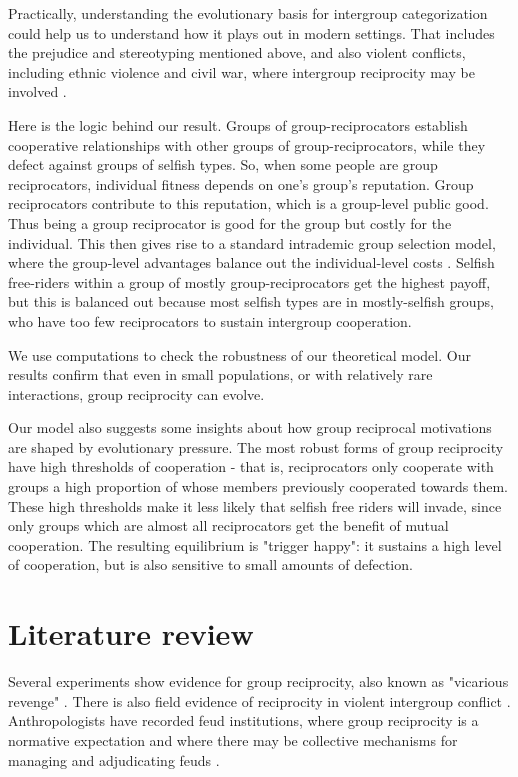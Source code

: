 \documentclass[12pt,a4paper]{article}
\begin{document}
Practically, understanding the evolutionary basis
for intergroup categorization could help us to understand how it plays out 
in modern settings. That includes the prejudice and stereotyping mentioned above,
and also violent conflicts, including ethnic violence and civil war, where
intergroup reciprocity may be involved 
\parencite{horowitz1985ethnicgroups,horowitz2001thedeadly,haushofer_both_2010}. 

Here is the logic behind our result. Groups of group-reciprocators
establish cooperative relationships with other groups of group-reciprocators,
while they defect against groups of selfish types. So, when some people are 
group reciprocators, individual fitness depends on one's group's reputation. Group 
reciprocators contribute to this reputation, which is a group-level public good. 
Thus being a group reciprocator is good for the group but costly for the individual. 
This then gives rise to a standard intrademic group selection model, where the group-level advantages balance out the individual-level costs \parencite{wilson1983group,wade1978critical}. Selfish free-riders within a group of mostly group-reciprocators get the highest payoff, but this is balanced
out because most selfish types are in mostly-selfish groups, who have too
few reciprocators to sustain intergroup cooperation.

We use computations to check the robustness of our theoretical model. Our
results confirm that even in small populations, or with relatively rare interactions,
group reciprocity can evolve.

Our model also suggests some insights
about how group reciprocal motivations are shaped by evolutionary pressure. The 
most robust forms of group reciprocity have high thresholds of cooperation - that is, reciprocators only cooperate with groups a high proportion of whose members previously
cooperated towards them. These high thresholds make it less likely that selfish
free riders will invade, since only groups which are almost all reciprocators
get the benefit of mutual cooperation. The resulting equilibrium is 
"trigger happy": it sustains a high level of cooperation, but is also sensitive 
to small amounts of defection.

\section{Literature review}

Several experiments show evidence for group reciprocity, also known as "vicarious
revenge" \parencite{lickel_vicarious_2006,gaertner2008whenrejection,stenstrom_roles_2008,hugh2017intergroup,hugh2019humans,romano2022direct}. There is also field 
evidence of reciprocity in violent intergroup conflict \parencite{haushofer_both_2010}.
Anthropologists have recorded feud institutions, where group reciprocity is a
normative expectation and where there may be collective mechanisms for managing 
and adjudicating feuds \parencite{boehm1984blood,chagnon1988lifehistories}. 
\end{document}
